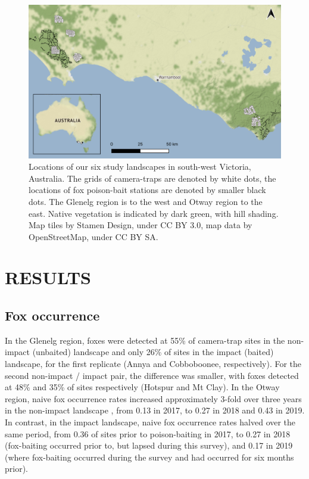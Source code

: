 \documentclass[]{elsarticle} %
\begin{document}
\newpage

\begin{figure}
\includegraphics[width=1\linewidth]{figs/fig1} \caption{Locations of our six study landscapes in south-west Victoria, Australia. The grids of camera-traps are denoted by white dots, the locations of fox poison-bait stations are denoted by smaller black dots. The Glenelg region is to the west and Otway region to the east. Native vegetation is indicated by dark green, with hill shading. Map tiles by Stamen Design, under CC BY 3.0, map data by OpenStreetMap, under CC BY SA.}\label{fig:map}
\end{figure}

\newpage

\hypertarget{results}{%
\section{RESULTS}\label{results}}

\hypertarget{fox-occurrence}{%
\subsection{Fox occurrence}\label{fox-occurrence}}

In the Glenelg region, foxes were detected at 55\% of camera-trap sites in the non-impact (unbaited) landscape and only 26\% of sites in the impact (baited) landscape, for the first replicate (Annya and Cobboboonee, respectively). For the second non-impact / impact pair, the difference was smaller, with foxes detected at 48\% and 35\% of sites respectively (Hotspur and Mt Clay). In the Otway region, naive fox occurrence rates increased approximately 3-fold over three years in the non-impact landscape , from 0.13 in 2017, to 0.27 in 2018 and 0.43 in 2019. In contrast, in the impact landscape, naive fox occurrence rates halved over the same period, from 0.36 of sites prior to poison-baiting in 2017, to 0.27 in 2018 (fox-baiting occurred prior to, but lapsed during this survey), and 0.17 in 2019 (where fox-baiting occurred during the survey and had occurred for six months prior).
\end{document}
